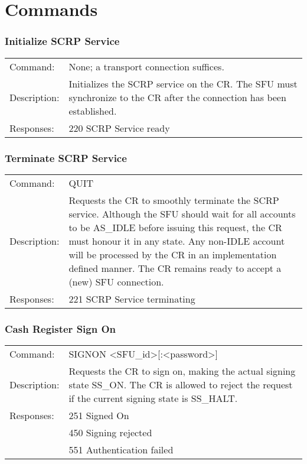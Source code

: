 \section*{Commands}

\subsubsection*{Initialize SCRP Service}
\begin{tabular}{lp{350px}}
Command: & None; a transport connection suffices. \\
Description: & Initializes the SCRP service on the CR. The SFU must synchronize to the CR after the connection has been established. \\
Responses: & 220 SCRP Service ready \\
\end{tabular}

\subsubsection*{Terminate SCRP Service}
\begin{tabular}{lp{350px}}
Command: & QUIT \\
Description: & Requests the CR to smoothly terminate the SCRP service. Although the SFU should wait for all accounts to be AS\_IDLE before issuing this request, the CR must honour it in any state. Any non-IDLE account will be processed by the CR in an implementation defined manner. The CR remains ready to accept a (new) SFU connection. \\
Responses: & 221 SCRP Service terminating
\end{tabular}

\subsubsection*{Cash Register Sign On}
\begin{tabular}{lp{350px}}
Command: & SIGNON <SFU\_id>[:<password>] \\
Description: & Requests the CR to sign on, making the actual signing state SS\_ON. The CR is allowed to reject the request if the current signing state is SS\_HALT. \\
Responses: & 251 Signed On  \\
& 450 Signing rejected \\
& 551 Authentication failed
\end{tabular}

